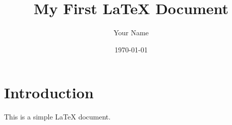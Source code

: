 \documentclass{article}
\title{My First LaTeX Document}
\author{Your Name}
\date{\today}
\begin{document}
\maketitle

\section{Introduction}
This is a simple LaTeX document.
\end{document}
